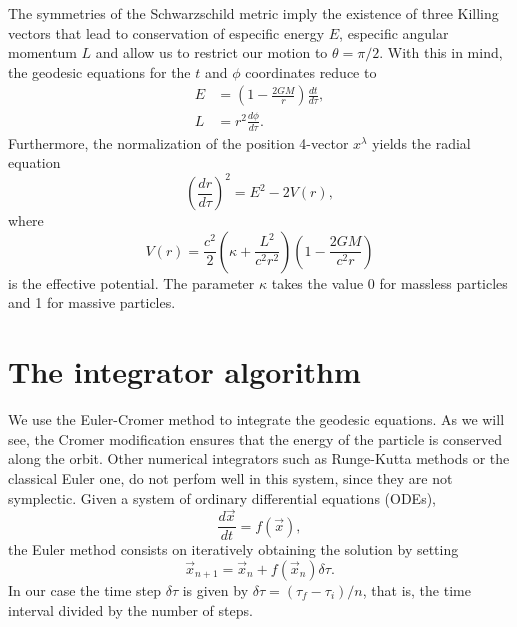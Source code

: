 \documentclass[journal, a4paper]{IEEEtran}
\begin{document}
The symmetries of the Schwarzschild metric imply the existence of three Killing vectors that lead to conservation of especific energy $E$, especific angular momentum $L$ and allow us to restrict our motion to $\theta = \pi/2$. With this in mind, the geodesic equations for the $t$ and $ \phi $ coordinates reduce to
\begin{equation}
	\begin{split}
		E & = \left( 1 - \frac{2GM}{r} \right) \frac{dt}{d \tau}, \\
		L & = r^2 \frac{d \phi}{d \tau}.
	\end{split}
\end{equation}
Furthermore, the normalization of the position 4-vector $x^\lambda$ yields the radial equation 
\begin{equation}\label{radial_equation}
	\left( \frac{dr}{d \tau} \right)^2 = E^2 - 2 V(r),
\end{equation}
where
\begin{equation}
	V(r) = \frac{c^2}{2} \left( \kappa + \frac{ L^2}{ c^2 r^2} \right) \left( 1 - \frac{2GM}{c^2 r} \right) 
\end{equation}
is the effective potential. The parameter \(\kappa\) takes the value 0 for massless particles and 1 for massive particles.
\section{The integrator algorithm}
We use the Euler-Cromer method to integrate the geodesic equations. As we will see, the Cromer modification ensures that the energy of the particle is conserved along the orbit. Other numerical integrators such as Runge-Kutta methods or the classical Euler one, do not perfom well in this system, since they are not symplectic.
Given a system of ordinary differential equations (ODEs),
\begin{equation}
	\frac{d \vec{x}}{dt} = f( \vec{x} ),
\end{equation}
the Euler method consists on iteratively obtaining the solution by setting
\begin{equation}
	\vec{x}_{n+1} = \vec{x}_{n} + f( \vec{x}_{n} ) \delta \tau.
\end{equation}
In our case the time step $ \delta \tau $ is given by $ \delta \tau = ( \tau _f - \tau _i) / n$, that is, the time interval divided by the number of steps.
\end{document}
